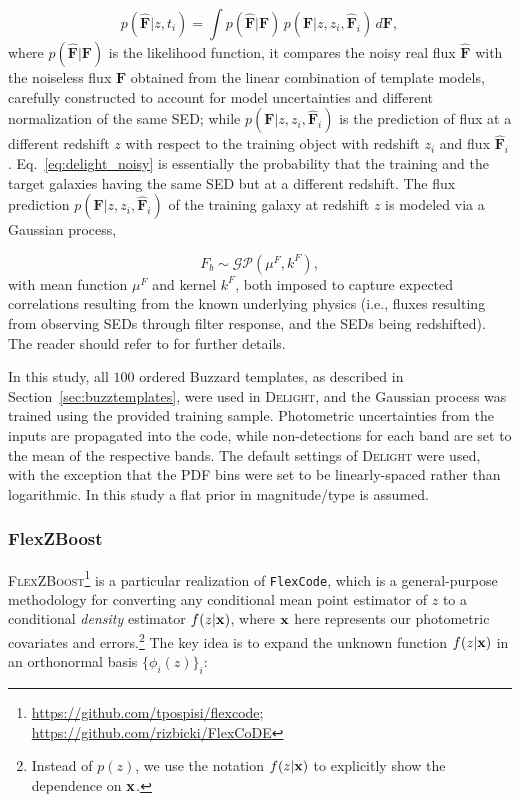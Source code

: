 \begin{equation} \label{eq:delight_noisy}
p(\mathbf{\hat{F}}|z,t_i) = \int p(\mathbf{\hat{F}}|\mathbf{F})\, p(\mathbf{F}|z,z_i,\mathbf{\hat{F}}_i)\, d\mathbf{F},
\end{equation}
where $p(\mathbf{\hat{F}}|\mathbf{F})$ is the likelihood function, it compares the noisy real flux $\mathbf{\hat{F}}$ with the noiseless flux $\mathbf{F}$ obtained from the linear combination of template models, carefully constructed to account for model uncertainties and different normalization of the same SED; while $p(\mathbf{F}|z,z_i,\mathbf{\hat{F}}_i)$ is the prediction of flux at a different redshift $z$ with respect to the training object with redshift $z_i$ and flux $\mathbf{\hat{F}}_i$. Eq.~\ref{eq:delight_noisy} is essentially the probability that the training and the target galaxies having the same SED but at a different redshift. The flux prediction $p(\mathbf{F}|z,z_i,\mathbf{\hat{F}}_i)$ of the training galaxy at redshift $z$ is modeled via a Gaussian process,

\begin{equation} \label{eq:delight_gp}
F_b \sim \mathcal{GP}\left( \mu^F,k^F \right),
\end{equation}
\noindent with mean function $\mu^F$ and kernel $k^F$, both imposed to capture expected correlations resulting from the known underlying physics (i.e., fluxes resulting from observing SEDs through filter response, and the SEDs being redshifted). The reader should refer to \citet{Leistedt:17} for further details.

In this study, all $100$ ordered Buzzard templates, as described in Section~\ref{sec:buzztemplates}, were used in \textsc{Delight}, and the Gaussian process was trained using the provided training sample. Photometric uncertainties from the inputs are propagated into the code, while non-detections for each band are set to the mean of the respective bands. The default settings of \textsc{Delight} were used, with the exception that the PDF bins were set to be linearly-spaced rather than logarithmic. In this study a flat prior in magnitude/type is assumed.


\subsubsection{FlexZBoost}
\label{sec:flexzboost}

\textsc{FlexZBoost}\footnote{\url{https://github.com/tpospisi/flexcode};\\ \url{https://github.com/rizbicki/FlexCoDE}} \citep{Izbicki:17} is a particular realization of \texttt{FlexCode}, which is a general-purpose methodology for converting any conditional mean point estimator of $z$ to a conditional {\em density} estimator $f(z \vert {\mathbf{x}})$, where ${\mathbf{x}}$ here represents our photometric covariates and errors.\footnote{Instead of $p(z)$, we use the notation $f(z \vert {\mathbf{x}})$ to explicitly show the dependence on ${\mathbf{x}}$.} The key idea is to expand the unknown function $f(z \vert {\mathbf{x}})$ in an orthonormal basis $\{\phi_i(z)\}_{i}$:

